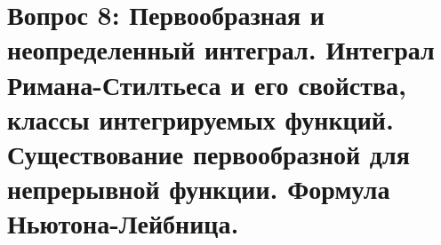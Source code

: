\section{Вопрос 8: Первообразная и неопределенный интеграл. Интеграл Римана-Стилтьеса и его свойства, классы интегрируемых функций. Существование первообразной для непрерывной функции. Формула Ньютона-Лейбница.}

